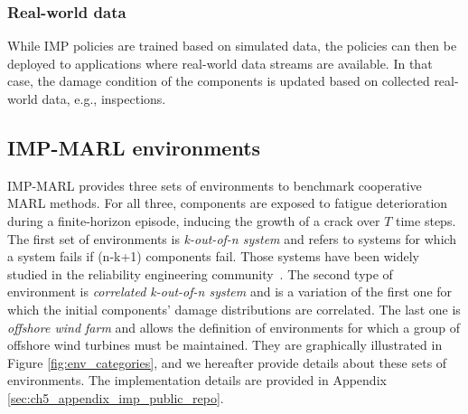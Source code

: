 \subsubsection{Real-world data}
While IMP policies are trained based on simulated data, the policies can then be deployed to applications where real-world data streams are available.
In that case, the damage condition of the components is updated based on collected real-world data, e.g., inspections.
 
\subsection{IMP-MARL environments}
\label{time stepsec:implement_env}

IMP-MARL provides three sets of environments to benchmark cooperative MARL methods.
For all three, components are exposed to fatigue deterioration during a finite-horizon episode, inducing the growth of a crack over $T$ time steps.
The first set of environments is \textit{k-out-of-n system} and refers to systems for which a system fails if (n-k+1) components fail.
Those systems have been widely studied in the reliability engineering community~\citep{barlow1984computing}. 
The second type of environment is \textit{correlated k-out-of-n system} and is a variation of the first one for which the initial components' damage distributions are correlated.
The last one is \textit{offshore wind farm} and allows the definition of environments for which a group of offshore wind turbines must be maintained.
They are graphically illustrated in Figure \ref{fig:env_categories}, and we hereafter provide details about these sets of environments.
The implementation details are provided in Appendix \ref{sec:ch5_appendix_imp_public_repo}.

